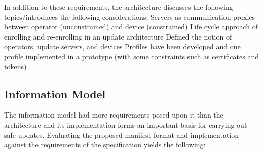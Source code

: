 \documentclass[0-thesis.tex]{subfiles}
\begin{document}
In addition to these requirements, the architecture discusses the following
topics/introduces the following considerations:
Servers as communication proxies between operator (unconstrained) and device (constrained)
Life cycle approach of enrolling and re-enrolling in an update architecture
Defined the notion of operators, update servers, and devices
Profiles have been developed and one profile implemented in a prototype (with some
constraints such as certificates and tokens)

  
\subsection{Information Model}
\label{ssec:information-evaluation}
The information model had more requirements posed upon it than the architecture and its
implementation forms an important basis for carrying out safe updates. Evaluating the
proposed manifest format and implementation against the requirements of the specification
yields the following:
\end{document}
